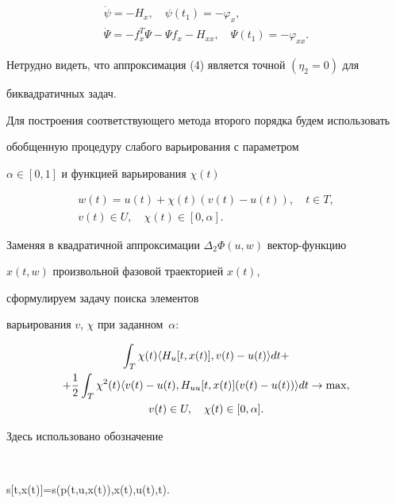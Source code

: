 \begin{gather*}


\Dot{\psi}=-H_x,\quad \psi(t_1)=-\varphi_x,\\


\Dot{\Psi}=-f^T_x\Psi -\Psi f_x-H_{xx},\quad \Psi(t_1)=-\varphi_{xx}.


\end{gather*}


Нетрудно видеть, что аппроксимация (4) является точной $(\eta_2=0)$ для


биквадратичных задач.





Для построения соответствующего метода второго порядка будем использовать 


обобщенную процедуру слабого варьирования с параметром 


$\alpha\in[0,1]$ и функцией варьирования $\chi(t)$


\begin{gather*}


w(t)=u(t)+\chi(t)(v(t)-u(t)),\quad t\in T,\\


v(t)\in U,\quad \chi(t)\in[0,\alpha].


\end{gather*}


Заменяя в квадратичной аппроксимации $\Delta_2\Phi(u,w)$ вектор-функцию 


$x(t,w)$ произвольной фазовой траекторией $x(t)$, 


сформулируем задачу поиска элементов 


варьирования $v$, $\chi$ при заданном~$\alpha$:


\begin{gather}


\int_T\chi(t)\langle H_u[t,x(t)],v(t)-u(t)\rangle dt+\notag \\


+\frac{1}{2}\int_T\chi^2(t)\langle v(t)-u(t),H_{uu}[t,x(t)]


(v(t)-u(t))\rangle dt\rightarrow\max, \\


v(t)\in U,\quad \chi(t)\in[0,\alpha].\notag


\end{gather}


Здесь использовано обозначение


$$


s[t,x(t)]=s(p(t,u,x(t)),x(t),u(t),t).


